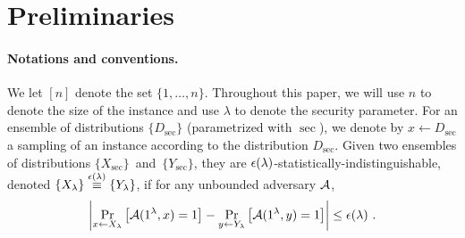 
\newcommand{\memsize}{{N}}
\newcommand{\blocksize}{{b}}
\newcommand{\Y}{{\bf Y}}

%
\section{Preliminaries}
\label{sec:defs}

\paragraph{Notations and conventions.}
We let $[n]$ denote the set $\{1,\ldots,n\}$. Throughout this paper, we will use
$n$ to denote the size of the instance and use $\lambda$ to denote the security parameter. 
For an ensemble of distributions $\{D_\sec\}$ (parametrized with $\sec$),
we denote by $x \leftarrow D_\sec$ a sampling of an instance according to the distribution $D_\sec$. 
Given two ensembles of distributions $\{X_\sec\}$~and~$\{Y_\sec\}$,
they are ${\epsilon}({\lambda})$-statistically-indistinguishable, denoted $\{X_{\lambda}\} \overset{{\epsilon}({\lambda})}{\equiv} \{Y_{\lambda}\}$, 
if for any unbounded adversary ${\cal A}$, 
\[
\left|\Pr_{x\leftarrow X_{\lambda}}\left[{\cal A}(1^\lambda, x)=1\right] - \Pr_{y\leftarrow Y_{\lambda}}\left[{\cal A}(1^\lambda, y)=1\right] \right| \leq {\epsilon}({\lambda}) \ .
\]



